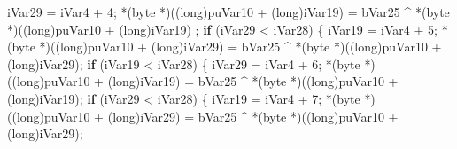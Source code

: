 \documentclass[
]{article}
\newenvironment{Shaded}{}{}
\newcommand{\ControlFlowTok}[1]{\textcolor[rgb]{0.00,0.44,0.13}{\textbf{#1}}}
\newcommand{\DataTypeTok}[1]{\textcolor[rgb]{0.56,0.13,0.00}{#1}}
\newcommand{\DecValTok}[1]{\textcolor[rgb]{0.25,0.63,0.44}{#1}}
\newcommand{\NormalTok}[1]{#1}
\newcommand{\OperatorTok}[1]{\textcolor[rgb]{0.40,0.40,0.40}{#1}}
\begin{document}
\begin{Shaded}
\begin{Highlighting}[]
\NormalTok{          iVar29 }\OperatorTok{=}\NormalTok{ iVar4 }\OperatorTok{+} \DecValTok{4}\OperatorTok{;}
          \OperatorTok{*(}\NormalTok{byte }\OperatorTok{*)((}\DataTypeTok{long}\OperatorTok{)}\NormalTok{puVar10 }\OperatorTok{+} \OperatorTok{(}\DataTypeTok{long}\OperatorTok{)}\NormalTok{iVar19}\OperatorTok{)} \OperatorTok{=}\NormalTok{ bVar25 }\OperatorTok{\^{}} \OperatorTok{*(}\NormalTok{byte }\OperatorTok{*)((}\DataTypeTok{long}\OperatorTok{)}\NormalTok{puVar10 }\OperatorTok{+} \OperatorTok{(}\DataTypeTok{long}\OperatorTok{)}\NormalTok{iVar19}\OperatorTok{)}
          \OperatorTok{;}
          \ControlFlowTok{if} \OperatorTok{(}\NormalTok{iVar29 }\OperatorTok{\textless{}}\NormalTok{ iVar28}\OperatorTok{)} \OperatorTok{\{}
\NormalTok{            iVar19 }\OperatorTok{=}\NormalTok{ iVar4 }\OperatorTok{+} \DecValTok{5}\OperatorTok{;}
            \OperatorTok{*(}\NormalTok{byte }\OperatorTok{*)((}\DataTypeTok{long}\OperatorTok{)}\NormalTok{puVar10 }\OperatorTok{+} \OperatorTok{(}\DataTypeTok{long}\OperatorTok{)}\NormalTok{iVar29}\OperatorTok{)} \OperatorTok{=}
\NormalTok{                 bVar25 }\OperatorTok{\^{}} \OperatorTok{*(}\NormalTok{byte }\OperatorTok{*)((}\DataTypeTok{long}\OperatorTok{)}\NormalTok{puVar10 }\OperatorTok{+} \OperatorTok{(}\DataTypeTok{long}\OperatorTok{)}\NormalTok{iVar29}\OperatorTok{);}
            \ControlFlowTok{if} \OperatorTok{(}\NormalTok{iVar19 }\OperatorTok{\textless{}}\NormalTok{ iVar28}\OperatorTok{)} \OperatorTok{\{}
\NormalTok{              iVar29 }\OperatorTok{=}\NormalTok{ iVar4 }\OperatorTok{+} \DecValTok{6}\OperatorTok{;}
              \OperatorTok{*(}\NormalTok{byte }\OperatorTok{*)((}\DataTypeTok{long}\OperatorTok{)}\NormalTok{puVar10 }\OperatorTok{+} \OperatorTok{(}\DataTypeTok{long}\OperatorTok{)}\NormalTok{iVar19}\OperatorTok{)} \OperatorTok{=}
\NormalTok{                   bVar25 }\OperatorTok{\^{}} \OperatorTok{*(}\NormalTok{byte }\OperatorTok{*)((}\DataTypeTok{long}\OperatorTok{)}\NormalTok{puVar10 }\OperatorTok{+} \OperatorTok{(}\DataTypeTok{long}\OperatorTok{)}\NormalTok{iVar19}\OperatorTok{);}
              \ControlFlowTok{if} \OperatorTok{(}\NormalTok{iVar29 }\OperatorTok{\textless{}}\NormalTok{ iVar28}\OperatorTok{)} \OperatorTok{\{}
\NormalTok{                iVar19 }\OperatorTok{=}\NormalTok{ iVar4 }\OperatorTok{+} \DecValTok{7}\OperatorTok{;}
                \OperatorTok{*(}\NormalTok{byte }\OperatorTok{*)((}\DataTypeTok{long}\OperatorTok{)}\NormalTok{puVar10 }\OperatorTok{+} \OperatorTok{(}\DataTypeTok{long}\OperatorTok{)}\NormalTok{iVar29}\OperatorTok{)} \OperatorTok{=}
\NormalTok{                     bVar25 }\OperatorTok{\^{}} \OperatorTok{*(}\NormalTok{byte }\OperatorTok{*)((}\DataTypeTok{long}\OperatorTok{)}\NormalTok{puVar10 }\OperatorTok{+} \OperatorTok{(}\DataTypeTok{long}\OperatorTok{)}\NormalTok{iVar29}\OperatorTok{);}

\end{Highlighting}
\end{Shaded}
\end{document}
